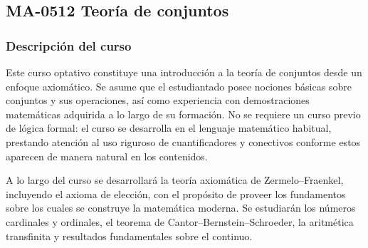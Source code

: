 \newpage
\subsection*{MA-0512 Teoría de conjuntos}

\hypertarget{MA0512}{}
\begin{refsection}
\begin{table}[H]
\end{table}

\subsubsection*{Descripción del curso}

Este curso optativo constituye una introducción a la teoría de conjuntos desde un enfoque axiomático. Se asume que el estudiantado posee nociones básicas sobre conjuntos y sus operaciones, así como experiencia con demostraciones matemáticas adquirida a lo largo de su formación. No se requiere un curso previo de lógica formal: el curso se desarrolla en el lenguaje matemático habitual, prestando atención al uso riguroso de cuantificadores y conectivos conforme estos aparecen de manera natural en los contenidos.

A lo largo del curso se desarrollará la teoría axiomática de Zermelo--Fraenkel, incluyendo el axioma de elección, con el propósito de proveer los fundamentos sobre los cuales se construye la matemática moderna. Se estudiarán los números cardinales y ordinales, el teorema de Cantor--Bernstein--Schroeder, la aritmética transfinita y resultados fundamentales sobre el continuo.


\end{refsection}
